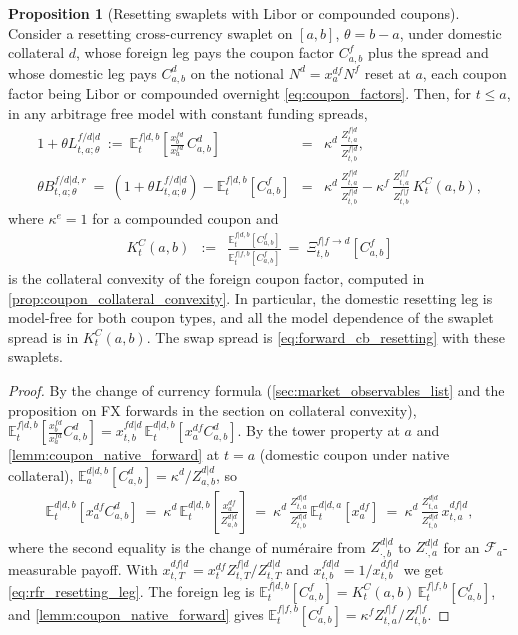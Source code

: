 \documentclass[11pt,english]{amsart}
\newcommand{\EE}{\mathbb{E}}
\newcommand{\Q}{\Xi}
\theoremstyle{definition}
\newtheorem{prop}{Proposition}
\begin{document}
\begin{prop}[Resetting swaplets with Libor or compounded coupons]\label{prop:rfr_ccs_swaplet}
Consider a resetting cross-currency swaplet on $[a,b]$, $\theta = b-a$, under domestic collateral $d$, whose foreign leg pays the coupon factor $C^f_{a,b}$ plus the spread and whose domestic leg pays $C^d_{a,b}$ on the notional $N^d = x^{df}_aN^f$ reset at $a$, each coupon factor being Libor or compounded overnight \eqref{eq:coupon_factors}. Then, for $t\le a$, in any arbitrage free model with constant funding spreads,
\begin{eqnarray}
  1+\theta L^{f/d|d}_{t,a;\theta} ~:=~ \EE^{f|d,b}_t\left[ \frac{x^{fd}_{b}}{x^{fd}_{a}}\, C^d_{a,b} \right] &=& \kappa^d\,\frac{Z^{f|d}_{t,a}}{Z^{f|d}_{t,b}} , \label{eq:rfr_resetting_leg}\\
  \theta B^{f/d|d,r}_{t,a;\theta} ~=~ \left(1+\theta L^{f/d|d}_{t,a;\theta}\right) - \EE^{f|d,b}_t\left[C^f_{a,b}\right] &=& \kappa^d\,\frac{Z^{f|d}_{t,a}}{Z^{f|d}_{t,b}} - \kappa^f\,\frac{Z^{f|f}_{t,a}}{Z^{f|f}_{t,b}}\,K^{C}_t(a,b) , \label{eq:rfr_swaplet_spread}
\end{eqnarray}
where $\kappa^e = 1$ for a compounded coupon and
\begin{eqnarray}
  K^{C}_t(a,b) &:=& \frac{\EE^{f|d,b}_t\left[C^f_{a,b}\right]}{\EE^{f|f,b}_t\left[C^f_{a,b}\right]} ~=~ \Q^{f|f\to d}_{t,b}\left[C^f_{a,b}\right]
  \label{eq:coupon_convexity_def}
\end{eqnarray}
is the collateral convexity of the foreign coupon factor, computed in \autoref{prop:coupon_collateral_convexity}. In particular, the domestic resetting leg is model-free for both coupon types, and all the model dependence of the swaplet spread is in $K^C_t(a,b)$. The swap spread is \eqref{eq:forward_cb_resetting} with these swaplets.
\end{prop}

\begin{proof}
By the change of currency formula (\autoref{sec:market_observables_list} and the proposition on FX forwards in the section on collateral convexity), $\EE^{f|d,b}_t[\frac{x^{fd}_b}{x^{fd}_a}C^d_{a,b}] = x^{fd|d}_{t,b}\,\EE^{d|d,b}_t[x^{df}_aC^d_{a,b}]$. By the tower property at $a$ and \autoref{lemm:coupon_native_forward} at $t = a$ (domestic coupon under native collateral), $\EE^{d|d,b}_a[C^d_{a,b}] = \kappa^d/Z^{d|d}_{a,b}$, so
\begin{eqnarray*}
  \EE^{d|d,b}_t\left[x^{df}_aC^d_{a,b}\right] ~=~ \kappa^d\,\EE^{d|d,b}_t\left[\frac{x^{df}_a}{Z^{d|d}_{a,b}}\right] ~=~ \kappa^d\,\frac{Z^{d|d}_{t,a}}{Z^{d|d}_{t,b}}\,\EE^{d|d,a}_t\left[x^{df}_a\right] ~=~ \kappa^d\,\frac{Z^{d|d}_{t,a}}{Z^{d|d}_{t,b}}\,x^{df|d}_{t,a} ,
\end{eqnarray*}
where the second equality is the change of num\'eraire from $Z^{d|d}_{\cdot,b}$ to $Z^{d|d}_{\cdot,a}$ for an $\mathcal{F}_a$-measurable payoff. With $x^{df|d}_{t,T} = x^{df}_tZ^{f|d}_{t,T}/Z^{d|d}_{t,T}$ and $x^{fd|d}_{t,b} = 1/x^{df|d}_{t,b}$ we get \eqref{eq:rfr_resetting_leg}. The foreign leg is $\EE^{f|d,b}_t[C^f_{a,b}] = K^C_t(a,b)\,\EE^{f|f,b}_t[C^f_{a,b}]$, and \autoref{lemm:coupon_native_forward} gives $\EE^{f|f,b}_t[C^f_{a,b}] = \kappa^fZ^{f|f}_{t,a}/Z^{f|f}_{t,b}$.
\end{proof}
\end{document}
